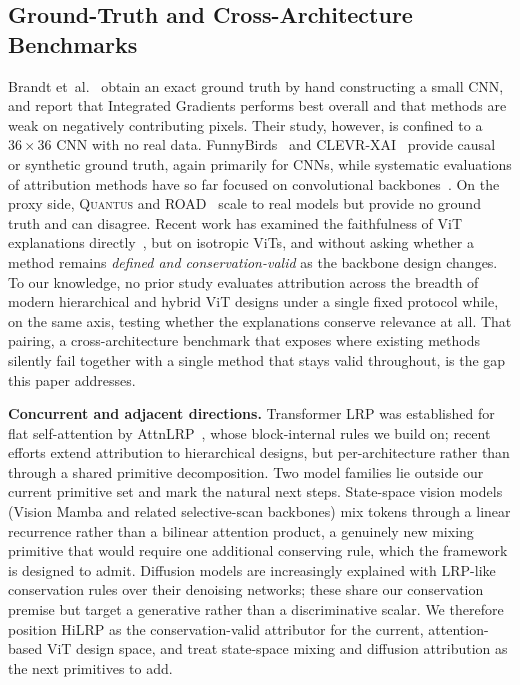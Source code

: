 \documentclass[lettersize,journal]{IEEEtran}
\begin{document}
\subsection{Ground-Truth and Cross-Architecture Benchmarks}
Brandt et~al.~\cite{brandt2023precise} obtain an exact ground truth by hand
constructing a small CNN, and report that Integrated Gradients performs best
overall and that methods are weak on negatively contributing pixels. Their study,
however, is confined to a $36\times36$ CNN with no real data.
FunnyBirds~\cite{hesse2023funnybirds} and CLEVR-XAI~\cite{arras2022clevrxai}
provide causal or synthetic ground truth, again primarily for CNNs, while
systematic evaluations of attribution methods have so far focused on convolutional
backbones~\cite{rao2022attribution}. On the proxy side, \textsc{Quantus}
\cite{hedstrom2023quantus} and ROAD~\cite{rong2022road} scale to real models but
provide no ground truth and can disagree. Recent work has examined the
faithfulness of ViT explanations directly~\cite{wu2024faithfulness}, but on
isotropic ViTs, and without asking whether a method remains \emph{defined and
conservation-valid} as the backbone design changes. To our knowledge, no prior
study evaluates attribution across the breadth of modern hierarchical and hybrid
ViT designs under a single fixed protocol while, on the same axis, testing
whether the explanations conserve relevance at all. That pairing, a
cross-architecture benchmark that exposes where existing methods silently fail
together with a single method that stays valid throughout, is the gap this paper
addresses.

\textbf{Concurrent and adjacent directions.} Transformer LRP was established for flat self-attention by AttnLRP~\cite{achtibat2024attnlrp}, whose block-internal rules we build on; recent efforts extend attribution to hierarchical designs, but per-architecture rather than through a shared primitive decomposition. Two model families lie outside our current primitive set and mark the natural next steps. State-space vision models (Vision Mamba and related selective-scan backbones) mix tokens through a linear recurrence rather than a bilinear attention product, a genuinely new mixing primitive that would require one additional conserving rule, which the framework is designed to admit. Diffusion models are increasingly explained with LRP-like conservation rules over their denoising networks; these share our conservation premise but target a generative rather than a discriminative scalar. We therefore position HiLRP as the conservation-valid attributor for the current, attention-based ViT design space, and treat state-space mixing and diffusion attribution as the next primitives to add.
\end{document}
